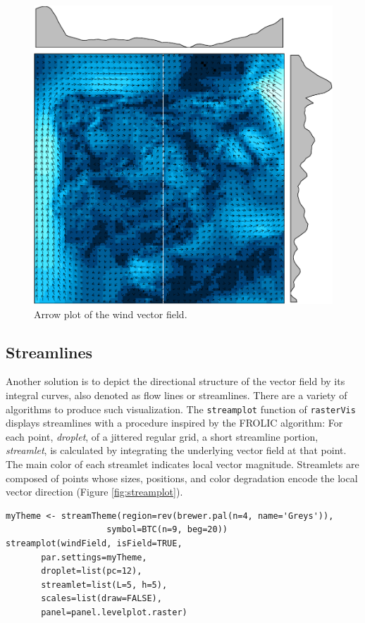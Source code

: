 \begin{figure}[htb]
\centering
\includegraphics[width=.9\linewidth]{figs/vectorplot.pdf}
\caption{\label{fig:vectorplot}Arrow plot of the wind vector field.}
\end{figure}
\subsection{Streamlines}
\label{sec-1-2}
Another solution is to depict the directional structure of the vector
field by its integral curves, also denoted as flow lines or
streamlines. There are a variety of algorithms to produce such
visualization. The \texttt{streamplot} function of \texttt{rasterVis} displays
streamlines with a procedure inspired by the FROLIC algorithm: For
each point, \emph{droplet}, of a jittered regular grid, a short streamline
portion, \emph{streamlet}, is calculated by integrating the underlying
vector field at that point. The main color of each streamlet indicates
local vector magnitude. Streamlets are composed of points whose sizes,
positions, and color degradation encode the local vector direction
(Figure \ref{fig:streamplot}).

\lstset{language=R,numbers=none}
\begin{lstlisting}
myTheme <- streamTheme(region=rev(brewer.pal(n=4, name='Greys')),
				    symbol=BTC(n=9, beg=20))
streamplot(windField, isField=TRUE,
	   par.settings=myTheme,
	   droplet=list(pc=12),
	   streamlet=list(L=5, h=5),
	   scales=list(draw=FALSE),
	   panel=panel.levelplot.raster)
\end{lstlisting}

